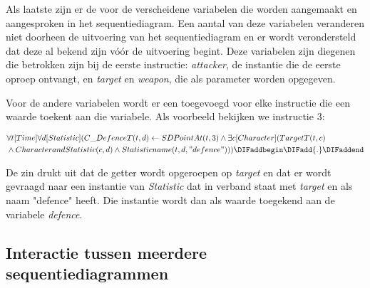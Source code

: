 \parbreak

Als laatste zijn er de \DIFdelbegin \textit{}%
\DIFdelend \DIFaddbegin {}\DIFaddend voor de verscheidene variabelen die worden aangemaakt en aangesproken in het sequentiediagram. Een aantal van deze variabelen veranderen niet doorheen de uitvoering van het sequentiediagram en er wordt verondersteld dat deze al bekend zijn v\'o\'or de uitvoering begint. Deze variabelen zijn diegenen die betrokken zijn bij de eerste instructie: \textit{attacker}, de instantie die de eerste oproep ontvangt, en \textit{target} en \textit{weapon}, die als parameter worden opgegeven.

Voor de andere variabelen wordt er een \DIFdelbegin \textit{}%
\DIFdelend \DIFaddbegin {}\DIFaddend toegevoegd voor elke instructie die een waarde toekent aan die variabele. Als voorbeeld bekijken we instructie 3:

\begin{align*}
	&\forall{t}[Time]\forall{d}[Statistic](C\_DefenceT(t, d) \leftarrow SDPointAt(t, 3) \land \exists{c}[Character](TargetT(t, c) \\ &\land CharacterandStatistic(c, d) \land Statisticname(t, d, "defence")))\DIFaddbegin \DIFadd{.
}\DIFaddend \end{align*}


De zin drukt uit dat de getter wordt opgeroepen op \textit{target} en dat er wordt gevraagd naar een instantie van \textit{Statistic} dat in verband staat met \textit{target} en als naam "defence" heeft. Die instantie wordt dan als waarde toegekend aan de variabele \textit{defence}.

\DIFdelbegin \subsection{}
\addtocounter{subsection}{-1}%


\DIFdelend \DIFaddbegin {}\DIFaddend 


\subsection{Interactie tussen meerdere sequentiediagrammen}
